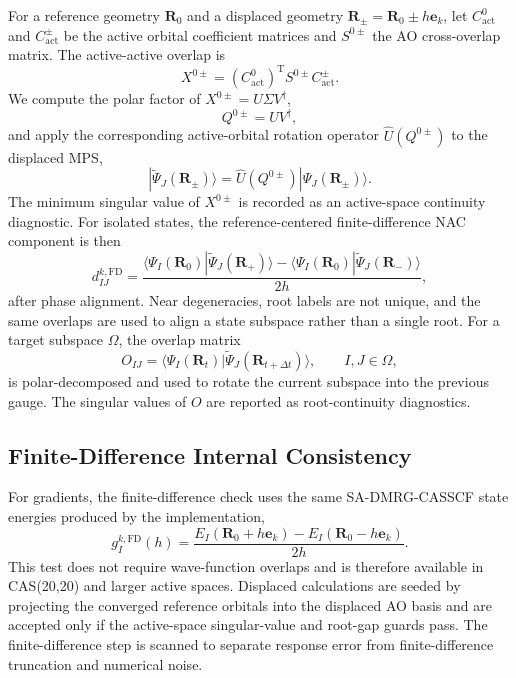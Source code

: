 \documentclass[journal=jctcce,manuscript=article]{achemso}
\newcommand{\bfR}{\mathbf{R}}
\begin{document}
For a reference geometry $\bfR_0$ and a displaced geometry $\bfR_\pm=\bfR_0\pm h\mathbf e_k$, let $C^0_{\mathrm{act}}$ and $C^\pm_{\mathrm{act}}$ be the active orbital coefficient matrices and $S^{0\pm}$ the AO cross-overlap matrix.
The active-active overlap is
\begin{equation}
X^{0\pm}=(C^0_{\mathrm{act}})^{\mathrm T}S^{0\pm}C^\pm_{\mathrm{act}}.
\end{equation}
We compute the polar factor of $X^{0\pm}=U\Sigma V^\dagger$,
\begin{equation}
Q^{0\pm}=UV^\dagger,
\end{equation}
and apply the corresponding active-orbital rotation operator $\hat U(Q^{0\pm})$ to the displaced MPS,
\begin{equation}
|\widetilde\Psi_J(\bfR_\pm)\rangle=\hat U(Q^{0\pm})|\Psi_J(\bfR_\pm)\rangle.
\end{equation}
The minimum singular value of $X^{0\pm}$ is recorded as an active-space continuity diagnostic.
For isolated states, the reference-centered finite-difference NAC component is then
\begin{equation}
\label{eq:fd-nac}
d^{k,\mathrm{FD}}_{IJ}=\frac{\langle\Psi_I(\bfR_0)|\widetilde\Psi_J(\bfR_+)\rangle-\langle\Psi_I(\bfR_0)|\widetilde\Psi_J(\bfR_-)\rangle}{2h},
\end{equation}
after phase alignment.
Near degeneracies, root labels are not unique, and the same overlaps are used to align a state subspace rather than a single root.
For a target subspace $\Omega$, the overlap matrix
\begin{equation}
O_{IJ}=\langle\Psi_I(\bfR_t)|\widetilde\Psi_J(\bfR_{t+\Delta t})\rangle,
\qquad I,J\in\Omega,
\end{equation}
is polar-decomposed and used to rotate the current subspace into the previous gauge.
The singular values of $O$ are reported as root-continuity diagnostics.

\subsection{Finite-Difference Internal Consistency}
For gradients, the finite-difference check uses the same SA-DMRG-CASSCF state energies produced by the implementation,
\begin{equation}
\label{eq:fd-gradient}
g^{k,\mathrm{FD}}_I(h)=\frac{E_I(\bfR_0+h\mathbf e_k)-E_I(\bfR_0-h\mathbf e_k)}{2h}.
\end{equation}
This test does not require wave-function overlaps and is therefore available in CAS(20,20) and larger active spaces.
Displaced calculations are seeded by projecting the converged reference orbitals into the displaced AO basis and are accepted only if the active-space singular-value and root-gap guards pass.
The finite-difference step is scanned to separate response error from finite-difference truncation and numerical noise.
\end{document}
